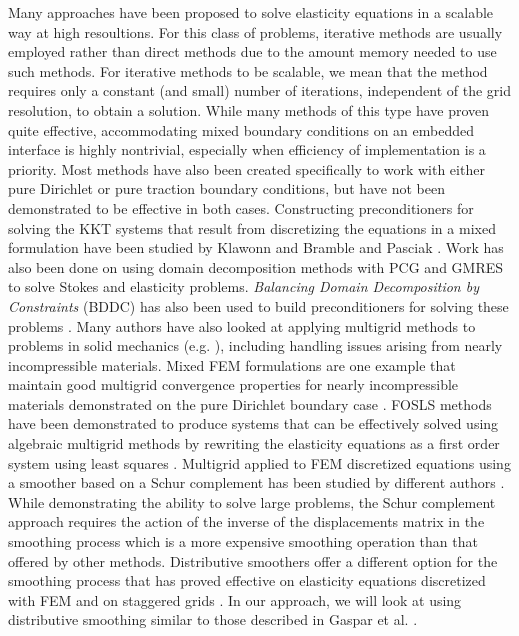 Many approaches have been proposed to solve elasticity equations in a scalable way at high resoultions. For this class of problems, iterative methods are usually employed rather than direct methods due to the amount memory needed to use such methods. For iterative methods to be scalable, we mean that the method requires only a constant (and small) number of iterations, independent of the grid resolution, to obtain a solution. While many methods of this type have proven quite effective, accommodating mixed boundary conditions on an embedded interface is highly nontrivial, especially when efficiency of implementation is a priority. Most methods have also been created specifically to work with either pure Dirichlet or pure traction boundary conditions, but have not been demonstrated to be effective in both cases. Constructing preconditioners for solving the KKT systems that result from discretizing the equations in a mixed formulation have been studied by Klawonn \cite{Klawonn95, Klawonn98.1} and Bramble and Pasciak \cite{Bramble88}. Work has also been done on using domain decomposition methods with PCG \cite{Farhat00} and GMRES \cite{Klawonn98.2} to solve Stokes and elasticity problems. \emph{Balancing Domain Decomposition by Constraints} (BDDC) has also been used to build preconditioners for solving these problems \cite{Dohrmann03, Pavarino10}. Many authors have also looked at applying multigrid methods to problems in solid mechanics (e.g. \cite{Zhu.Yongning10, Verfurth84, Kocvara87, Haung90, Brenner93, Cai.Zhiqiang98, Hiptmair99, Axelsson99, Schoberl99, Wieners00, Heys04, Lee.Young-Ju09, Gaspar08}), including handling issues arising from nearly incompressible materials. Mixed FEM formulations are one example that maintain good multigrid convergence properties for nearly incompressible materials demonstrated on the pure Dirichlet boundary case \cite{Brenner93, Schoberl99, Lee.Young-Ju09}. FOSLS methods have been demonstrated to produce systems that can be effectively solved using algebraic multigrid methods by rewriting the elasticity equations as a first order system using least squares \cite{Cai.Zhiqiang98, Heys04}. Multigrid applied to FEM discretized equations using a smoother based on a Schur complement has been studied by different authors \cite{Axelsson99, Wieners00}. While demonstrating the ability to solve large problems, the Schur complement approach requires the action of the inverse of the displacements matrix in the smoothing process which is a more expensive smoothing operation than that offered by other methods. Distributive smoothers offer a different option for the smoothing process that has proved effective on elasticity equations discretized with FEM \cite{Hiptmair99} and on staggered grids \cite{Gaspar08}. In our approach, we will look at using distributive smoothing similar to those described in Gaspar et al. \cite{Gaspar08}.

